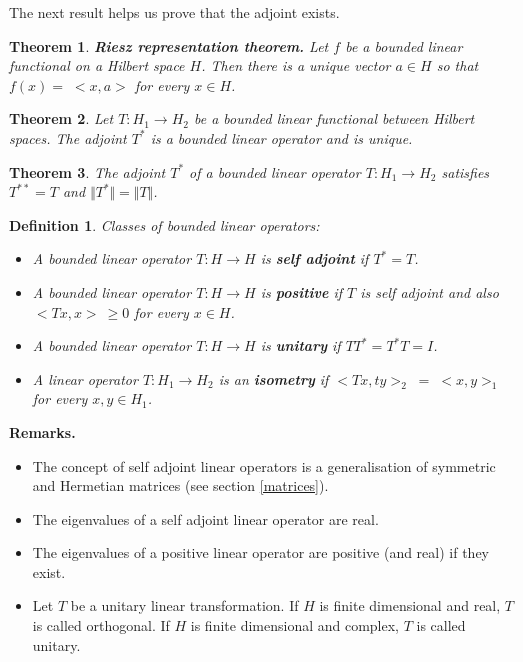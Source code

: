 \documentclass[two column]{article}
\newtheorem{theorem}{Theorem}[subsection]
\newtheorem{definition}{Definition}[subsection]
\begin{document}
The next result helps us prove that the adjoint exists. \\

\begin{theorem}
{\bf Riesz representation theorem.} Let $f$ be a bounded linear functional on a Hilbert space $H$. Then there is a unique vector $a \in H$ so that $f(x) = \; < x,a >$ for every $x \in H$. \\
\end{theorem}

\begin{theorem}
Let $T : H_{1} \rightarrow H_{2}$ be a bounded linear functional between Hilbert spaces. The adjoint $T^{\ast}$ is a bounded linear operator and is unique. \\
\end{theorem}

\begin{theorem}
The adjoint $T^{\ast}$ of a bounded linear operator $T : H_{1} \rightarrow H_{2}$ satisfies $T^{\ast\ast} = T$ and $\Vert T^{\ast} \Vert = \Vert T \Vert$. \\
\end{theorem}

\begin{definition}
Classes of bounded linear operators:
\begin{itemize}
\item A bounded linear operator $T : H \rightarrow H$ is {\bf self adjoint} if $T^{\ast} = T$. \vspace{-5pt}
\item A bounded linear operator $T : H \rightarrow H$ is {\bf positive} if $T$ is self adjoint and also $< Tx,x > \: \geq 0$ for every $x \in H$. \vspace{-15pt} 
\item A bounded linear operator $T : H \rightarrow H$ is {\bf unitary} if $TT^{\ast} = T^{\ast}T = I$. \vspace{-5pt} 
\item A linear operator $T : H_{1} \rightarrow H_{2}$ is an {\bf isometry} if $< Tx,ty >_{2} \; = \; < x,y >_{1}$ for every $x,y \in H_{1}$. \\
\end{itemize}
\end{definition}

{\bf Remarks.}
\begin{itemize}
\item The concept of self adjoint linear operators is a generalisation of symmetric and Hermetian matrices (see section \ref{matrices}). 
\item The eigenvalues of a self adjoint linear operator are real. 
\item The eigenvalues of a positive linear operator are positive (and real) if they exist.
\item Let $T$ be a unitary linear transformation. If $H$ is finite dimensional and real, $T$ is called orthogonal. If $H$ is finite dimensional and complex, $T$ is called unitary. \\
\end{itemize}
\end{document}
